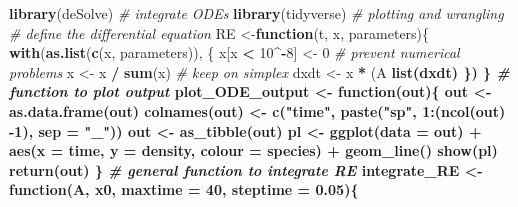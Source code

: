 \documentclass[
]{book}
\newenvironment{Shaded}{\begin{snugshade}}{\end{snugshade}}
\newcommand{\CommentTok}[1]{\textcolor[rgb]{0.56,0.35,0.01}{\textit{#1}}}
\newcommand{\ControlFlowTok}[1]{\textcolor[rgb]{0.13,0.29,0.53}{\textbf{#1}}}
\newcommand{\DataTypeTok}[1]{\textcolor[rgb]{0.13,0.29,0.53}{#1}}
\newcommand{\DecValTok}[1]{\textcolor[rgb]{0.00,0.00,0.81}{#1}}
\newcommand{\FloatTok}[1]{\textcolor[rgb]{0.00,0.00,0.81}{#1}}
\newcommand{\KeywordTok}[1]{\textcolor[rgb]{0.13,0.29,0.53}{\textbf{#1}}}
\newcommand{\NormalTok}[1]{#1}
\newcommand{\OperatorTok}[1]{\textcolor[rgb]{0.81,0.36,0.00}{\textbf{#1}}}
\newcommand{\StringTok}[1]{\textcolor[rgb]{0.31,0.60,0.02}{#1}}
\begin{document}
\begin{Shaded}
\begin{Highlighting}[]
\KeywordTok{library}\NormalTok{(deSolve) }\CommentTok{# integrate ODEs}
\KeywordTok{library}\NormalTok{(tidyverse) }\CommentTok{# plotting and wrangling}
\CommentTok{# define the differential equation}
\NormalTok{RE <-}\ControlFlowTok{function}\NormalTok{(t, x, parameters)\{}
  \KeywordTok{with}\NormalTok{(}\KeywordTok{as.list}\NormalTok{(}\KeywordTok{c}\NormalTok{(x, parameters)), \{}
\NormalTok{    x[x }\OperatorTok{<}\StringTok{ }\DecValTok{10}\OperatorTok{^-}\DecValTok{8}\NormalTok{] <-}\StringTok{ }\DecValTok{0} \CommentTok{# prevent numerical problems}
\NormalTok{    x <-}\StringTok{ }\NormalTok{x }\OperatorTok{/}\StringTok{ }\KeywordTok{sum}\NormalTok{(x) }\CommentTok{# keep on simplex}
\NormalTok{    dxdt <-}\StringTok{ }\NormalTok{x }\OperatorTok{*}\StringTok{ }\NormalTok{(A }\OperatorTok{%
    \KeywordTok{list}\NormalTok{(dxdt)}
\NormalTok{  \})}
\NormalTok{\}}
\CommentTok{# function to plot output}
\NormalTok{plot_ODE_output <-}\StringTok{ }\ControlFlowTok{function}\NormalTok{(out)\{}
\NormalTok{  out <-}\StringTok{ }\KeywordTok{as.data.frame}\NormalTok{(out)}
  \KeywordTok{colnames}\NormalTok{(out) <-}\StringTok{ }\KeywordTok{c}\NormalTok{(}\StringTok{"time"}\NormalTok{, }\KeywordTok{paste}\NormalTok{(}\StringTok{"sp"}\NormalTok{, }\DecValTok{1}\OperatorTok{:}\NormalTok{(}\KeywordTok{ncol}\NormalTok{(out) }\DecValTok{-1}\NormalTok{), }\DataTypeTok{sep =} \StringTok{"_"}\NormalTok{))}
\NormalTok{  out <-}\StringTok{ }\KeywordTok{as_tibble}\NormalTok{(out) }\OperatorTok{%
\NormalTok{  pl <-}\StringTok{ }\KeywordTok{ggplot}\NormalTok{(}\DataTypeTok{data =}\NormalTok{ out) }\OperatorTok{+}\StringTok{ }
\StringTok{    }\KeywordTok{aes}\NormalTok{(}\DataTypeTok{x =}\NormalTok{ time, }\DataTypeTok{y =}\NormalTok{ density, }\DataTypeTok{colour =}\NormalTok{ species) }\OperatorTok{+}\StringTok{ }
\StringTok{    }\KeywordTok{geom_line}\NormalTok{()}
  \KeywordTok{show}\NormalTok{(pl)}
  \KeywordTok{return}\NormalTok{(out)}
\NormalTok{\}}
\CommentTok{# general function to integrate RE}
\NormalTok{integrate_RE <-}\StringTok{ }\ControlFlowTok{function}\NormalTok{(A, x0, }\DataTypeTok{maxtime =} \DecValTok{40}\NormalTok{, }\DataTypeTok{steptime =} \FloatTok{0.05}\NormalTok{)\{}
}}
\end{Highlighting}
\end{Shaded}
\end{document}
